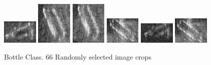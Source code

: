 \begin{figure}
    \includegraphics[width=0.15\textwidth]{chapters/images/dataset/all-class-images/bottle/bottle-77.jpg}
    \includegraphics[width=0.15\textwidth]{chapters/images/dataset/all-class-images/bottle/bottle-233.jpg}
    \includegraphics[width=0.15\textwidth]{chapters/images/dataset/all-class-images/bottle/bottle-219.jpg}
    \includegraphics[width=0.15\textwidth]{chapters/images/dataset/all-class-images/bottle/bottle-82.jpg}
    \includegraphics[width=0.15\textwidth]{chapters/images/dataset/all-class-images/bottle/bottle-36.jpg}
    \includegraphics[width=0.15\textwidth]{chapters/images/dataset/all-class-images/bottle/bottle-75.jpg}
    
    \caption{Bottle Class. 66 Randomly selected image crops}
    \label{appendix:bottle}
\end{figure}

